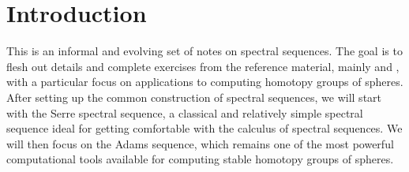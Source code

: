 \section{Introduction}
This is an informal and evolving set of notes on spectral sequences. The goal is to flesh out details and complete exercises from the reference material, mainly \cite{Hatcher-spec} and \cite{McCleary}, with a particular focus on applications to computing homotopy groups of spheres. After setting up the common construction of spectral sequences, we will start with the Serre spectral sequence, a classical and relatively simple spectral sequence ideal for getting comfortable with the calculus of spectral sequences. We will then focus on the Adams sequence, which remains one of the most powerful computational tools available for computing stable homotopy groups of spheres.